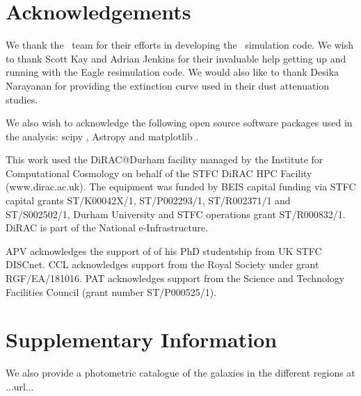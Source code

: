 \documentclass[fleqn,usenatbib]{mnras}
\newcommand{\eagle}{\mbox{\sc{Eagle}}}
\begin{document}


\section*{Acknowledgements}
We thank the \eagle\, team for their efforts in developing the \eagle\, simulation code. We wish to thank Scott Kay and Adrian Jenkins for their invaluable help getting up and running with the Eagle resimulation code. We would also like to thank Desika Narayanan for providing the extinction curve used in their dust attenuation studies.

We also wish to acknowledge the following open source software packages used in the analysis: scipy \citep{2020SciPy-NMeth}, Astropy \citep{robitaille_astropy:_2013} and matplotlib \citep{Hunter:2007}. 

This work used the DiRAC@Durham facility managed by the Institute for Computational Cosmology on behalf of the STFC DiRAC HPC Facility (www.dirac.ac.uk). The equipment was funded by BEIS capital funding via STFC capital grants ST/K00042X/1, ST/P002293/1, ST/R002371/1 and ST/S002502/1, Durham University and STFC operations grant ST/R000832/1. DiRAC is part of the National e-Infrastructure. 

APV acknowledges the support of of his PhD studentship from UK STFC DISCnet. CCL acknowledges support from the Royal Society under
grant RGF/EA/181016. PAT acknowledges support from the Science and Technology Facilities Council (grant number ST/P000525/1).





\section*{Supplementary Information}
We also provide a photometric catalogue of the galaxies in the different regions at ...url... 


\appendix





\bsp	%
\label{lastpage}
\end{document}
